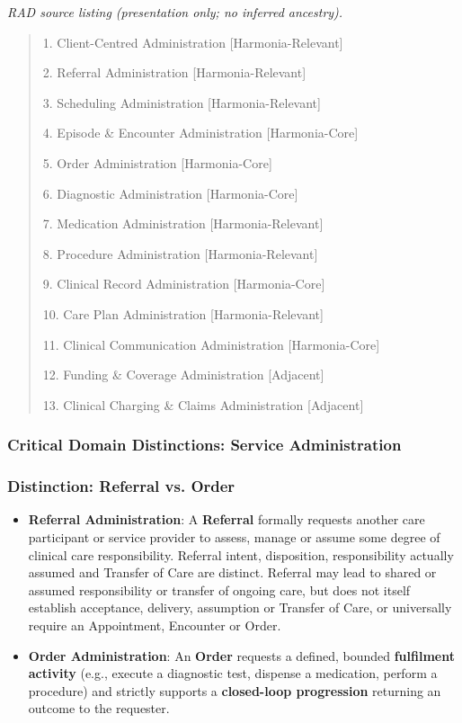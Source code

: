 \textit{RAD source listing (presentation only; no inferred ancestry).}
\begin{quote}
1. Client-Centred Administration [Harmonia-Relevant]

2. Referral Administration [Harmonia-Relevant]

3. Scheduling Administration [Harmonia-Relevant]

4. Episode \& Encounter Administration [Harmonia-Core]

5. Order Administration [Harmonia-Core]

6. Diagnostic Administration [Harmonia-Core]

7. Medication Administration [Harmonia-Relevant]

8. Procedure Administration [Harmonia-Relevant]

9. Clinical Record Administration [Harmonia-Core]

10. Care Plan Administration [Harmonia-Relevant]

11. Clinical Communication Administration [Harmonia-Core]

12. Funding \& Coverage Administration [Adjacent]

13. Clinical Charging \& Claims Administration [Adjacent]
\end{quote}
\label{rad:enabling:256}
\subsubsection*{Critical Domain Distinctions: Service Administration}
\label{rad:enabling:258}
\subsubsection*{Distinction: Referral vs. Order}
\label{rad:enabling:259}

\begin{itemize}

\item
\textbf{Referral Administration}: A \textbf{Referral} formally requests another care participant or service provider to assess, manage or assume some degree of clinical care responsibility. Referral intent, disposition, responsibility actually assumed and Transfer of Care are distinct. Referral may lead to shared or assumed responsibility or transfer of ongoing care, but does not itself establish acceptance, delivery, assumption or Transfer of Care, or universally require an Appointment, Encounter or Order.



\item
\textbf{Order Administration}: An \textbf{Order} requests a defined, bounded \textbf{fulfilment activity} (e.g., execute a diagnostic test, dispense a medication, perform a procedure) and strictly supports a \textbf{closed-loop progression} returning an outcome to the requester.



\end{itemize}
\label{rad:enabling:262}
